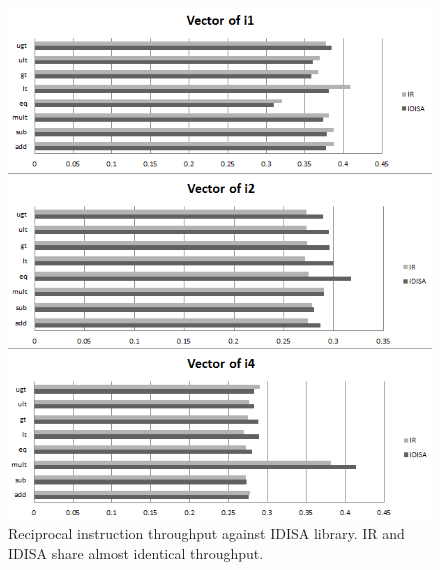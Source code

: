 \begin{figure}[ht!]
\centering
\includegraphics[width=140mm]{draw/reciprocal_throughput_vector.png}
\caption[Reciprocal instruction throughput against IDISA library]{Reciprocal instruction throughput against IDISA library. IR and IDISA share almost identical throughput.}
\label{figure:throughput_vector}
\end{figure}

